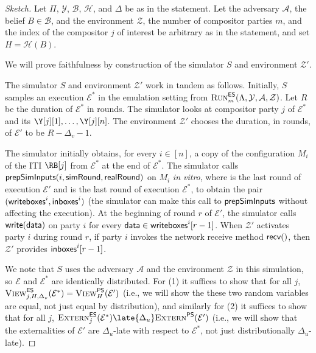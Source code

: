\begin{proof}[Sketch]
  Let $\Pi$, $\mathcal{Y}$, $\mathcal{B}$, $\mathcal{H}$,
  and $\Delta$ be as in the statement.
  Let the adversary $\mathcal{A}$, the belief $B \in \mathcal{B}$,
  and the environment $\mathcal{Z}$, the number of compositor parties $m$,
  and the index of the compositor $j$ of interest be arbitrary
  as in the statement, and set $H = \mathcal{H}(B)$.

  We will prove faithfulness by
  construction of the simulator $S$ and environment $\mathcal{Z}'$.

  The simulator $S$ and environment $\mathcal{Z}'$ work in tandem
  as follows.
  Initially, $S$ samples an execution
  $\mathcal{E}^*$ in the emulation setting from
  $\textsc{Run}^{\textsf{ES}}_m(\Lambda,\allowbreak\mathcal{Y},\allowbreak\mathcal{A},\allowbreak\mathcal{Z})$.
  Let $R$ be the duration of $\mathcal{E}^*$ in rounds.
  The simulator looks at compositor party $j$ of $\mathcal{E}^*$
  and its $\Y[j][1], \ldots, \Y[j][n]$.
  The environment $\mathcal{Z}'$ chooses the duration, in rounds, of
  $\mathcal{E}'$ to be $R - \Delta_v - 1$.

  The simulator initially obtains, for every $i \in [n]$,
  a copy of the configuration $M_i$ of the ITI $\RB[j]$ from $\mathcal{E}^*$ at the end of
  $\mathcal{E}^*$.
  The simulator calls $\textsf{prepSimInputs}(i, \textsf{simRound}, \textsf{realRound})$ on $M_i$
  \emph{in vitro}, where \simulationRound is the last round of execution $\mathcal{E}'$
  and \realityRound is the last round of execution $\mathcal{E}^*$, to obtain the pair
  $(\textsf{writeboxes}^i, \textsf{inboxes}^i)$
  (the simulator can make this call to $\textsf{prepSimInputs}$ without affecting the execution).
  At the beginning of round $r$ of $\mathcal{E}'$, the simulator calls
  $\textsf{write}(\textsf{data})$ on party $i$
  for every $\textsf{data} \in \textsf{writeboxes}^i[r - 1]$.
  When $\mathcal{Z}'$ activates party $i$ during round $r$,
  if party $i$ invokes the network receive method $\textsf{recv}()$, then $\mathcal{Z}'$
  provides $\textsf{inboxes}^i[r - 1]$.

  We note that $S$ uses the adversary $\mathcal{A}$ and the
  environment $\mathcal{Z}$ in this simulation, so $\mathcal{E}$
  and $\mathcal{E}^*$ are identically distributed.
  For (1) it suffices to show that for all $j$,
  $\textsc{View}^{\textsf{ES}}_{j,H,\Delta_v}(\mathcal{E}^*) = \textsc{View}^{\textsf{PS}}_H(\mathcal{E}')$
  (i.e., we will show the these two random variables are equal,
  not just equal by distribution),
  and similarly for (2) it suffices to show that for all $j$,
  $\LCExtern_j(\mathcal{E}^*) \late{\Delta_u} \PEExtern(\mathcal{E}')$
  (i.e., we will show that the externalities of $\mathcal{E}'$ are $\Delta_u$-late
  with respect to $\mathcal{E}^*$, not just distributionally $\Delta_u$-late).


\end{proof}
